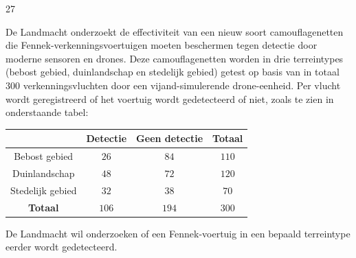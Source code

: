 \begin{question}{27}{
    De Landmacht onderzoekt de effectiviteit van een nieuw soort camouflagenetten die Fennek-verkenningsvoertuigen moeten beschermen tegen detectie door moderne sensoren en drones.
    Deze camouflagenetten worden in drie terreintypes (bebost gebied, duinlandschap en stedelijk gebied) getest op basis van in totaal $300$ verkenningsvluchten door een vijand-simulerende drone-eenheid.
    Per vlucht wordt geregistreerd of het voertuig wordt gedetecteerd of niet, zoals te zien in onderstaande tabel:\par\medskip
    \begin{center}
        \renewcommand{\arraystretch}{1.2}
        \begin{tabular}{cccc}
            \toprule
                & \textbf{Detectie} & \textbf{Geen detectie} & \textbf{Totaal} \\
            \midrule
                Bebost gebied & $26$ & $84$ & $110$  \\
                Duinlandschap & $48$ & $72$ & $120$  \\
                Stedelijk gebied & $32$ & $38$ & $70$  \\
            \midrule
                \textbf{Totaal} & $106$ & $194$ & $300$ \\
            \bottomrule
        \end{tabular}
    \end{center}
    \par\medskip
    De Landmacht wil onderzoeken of een Fennek-voertuig in een bepaald terreintype eerder wordt gedetecteerd.
}




\end{question}

